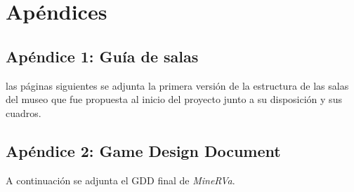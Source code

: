 \chapter{Apéndices}
\label{chap:apendices}

\section{Apéndice 1: Guía de salas}
\label{anexo:guia-salas}

 las páginas siguientes se adjunta la primera versión de la estructura de las salas del museo que fue propuesta al inicio del proyecto junto a su disposición y sus cuadros.



\section{Apéndice 2: Game Design Document}
\label{anexo:gdd}

A continuación se adjunta el \acs{GDD} final de \textit{MineRVa}.

\newpage




